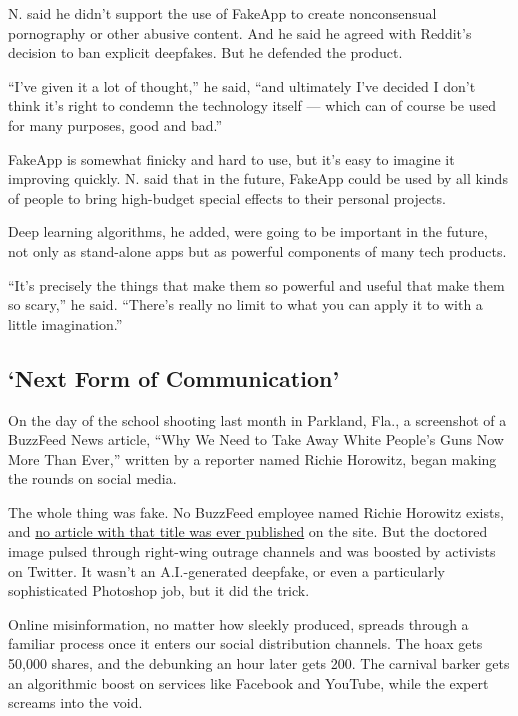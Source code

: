 N. said he didn't support the use of FakeApp to create nonconsensual
pornography or other abusive content. And he said he agreed with
Reddit's decision to ban explicit deepfakes. But he defended the
product.

``I've given it a lot of thought,'' he said, ``and ultimately I've
decided I don't think it's right to condemn the technology itself ---
which can of course be used for many purposes, good and bad.''

FakeApp is somewhat finicky and hard to use, but it's easy to imagine it
improving quickly. N. said that in the future, FakeApp could be used by
all kinds of people to bring high-budget special effects to their
personal projects.

Deep learning algorithms, he added, were going to be important in the
future, not only as stand-alone apps but as powerful components of many
tech products.

``It's precisely the things that make them so powerful and useful that
make them so scary,'' he said. ``There's really no limit to what you can
apply it to with a little imagination.''

\hypertarget{next-form-of-communication}{%
\subsection{`Next Form of
Communication'}\label{next-form-of-communication}}

On the day of the school shooting last month in Parkland, Fla., a
screenshot of a BuzzFeed News article, ``Why We Need to Take Away White
People's Guns Now More Than Ever,'' written by a reporter named Richie
Horowitz, began making the rounds on social media.

The whole thing was fake. No BuzzFeed employee named Richie Horowitz
exists, and \href{https://www.snopes.com/buzzfeed-white-people-guns/}{no
article with that title was ever published} on the site. But the
doctored image pulsed through right-wing outrage channels and was
boosted by activists on Twitter. It wasn't an A.I.-generated deepfake,
or even a particularly sophisticated Photoshop job, but it did the
trick.

Online misinformation, no matter how sleekly produced, spreads through a
familiar process once it enters our social distribution channels. The
hoax gets 50,000 shares, and the debunking an hour later gets 200. The
carnival barker gets an algorithmic boost on services like Facebook and
YouTube, while the expert screams into the void.

